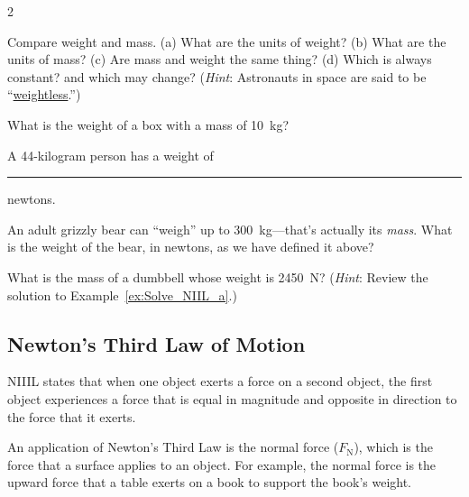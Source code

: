 \documentclass{article}
\numberwithin{equation}{section}
\numberwithin{figure}{section}
\begin{document}
\begin{multicols}{2}
\begin{exercise}
Compare weight and mass. (a) What are the units of weight? (b) What are the units of mass? (c) Are mass and weight the same thing? (d) Which is always constant? and which may change? (\textit{Hint}: Astronauts in space are said to be ``\href{https://youtu.be/C3GC5LS6e6Q}{weightless}.'')
\end{exercise}

\begin{exercise} \label{eStk9M}
What is the weight of a box with a mass of \SI{10}{kg}?
\end{exercise}

\begin{exercise} \label{x9Ufbz}
A 44-kilogram person has a weight of \rule{1cm}{0.15mm} newtons.
\end{exercise}

\begin{exercise} \label{r7dwXZ}
An adult grizzly bear can ``weigh'' up to \SI{300}{kg}---that's actually its \textit{mass}. What is the weight of the bear, in newtons, as we have defined it above?
\end{exercise}

\begin{exercise} \label{neLJbr}
What is the mass of a dumbbell whose weight is \SI{2450}{N}? (\textit{Hint}: Review the solution to Example~\ref{ex:Solve_NIIL_a}.)
\end{exercise}
\end{multicols}


\clearpage

\subsection{Newton's Third Law of Motion} \label{N3R3iq}

\begin{mdframed}[backgroundcolor=black!10]
\Gls{NIIIL} states that when one object exerts a force on a second object, the first object experiences a force that is equal in magnitude and opposite in direction to the force that it exerts.
\end{mdframed}

An application of Newton's Third Law is the \gls{normal force} ($F_{\text{N}}$), which is the force that a surface applies to an object. For example, the normal force is the upward force that a table exerts on a book to support the book's weight.
\end{document}
